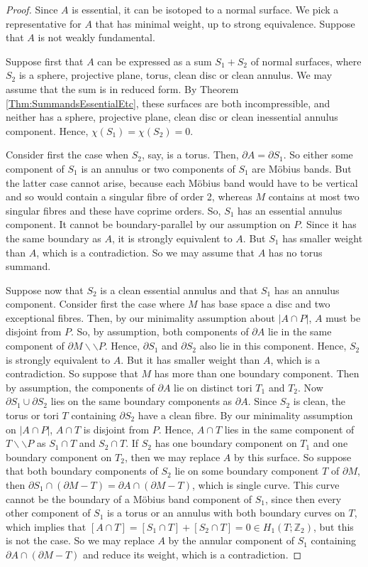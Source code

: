 \documentclass[10pt,a4paper]{amsart}
\newcommand{\cut}{\backslash\backslash}
\begin{document}
\begin{proof}
Since $A$ is essential, it can be isotoped to a normal surface. We pick a 
representative for $A$ that has minimal weight, up to strong equivalence. 
Suppose that $A$ is not weakly fundamental.

Suppose first that $A$ can be expressed as a sum
$S_1 + S_2$ of normal surfaces, where $S_2$ is a sphere, projective plane, torus, clean disc or clean annulus. We may assume
that the sum is in reduced form.
By Theorem \ref{Thm:SummandsEssentialEtc}, these surfaces are both incompressible,
and neither has a sphere, projective plane, clean disc or clean inessential annulus component. Hence, $\chi(S_1) = \chi(S_2) = 0$.

Consider first the case when $S_2$, say, is a torus. Then, $\partial A = \partial S_1$.
So either some component of $S_1$ is an annulus or two components of $S_1$ are
M\"obius bands. But the latter case cannot arise, because each M\"obius band would have to be vertical and so would contain
a singular fibre of order 2, whereas $M$ contains at most two singular fibres and these have coprime orders.
So, $S_1$ has an essential annulus component. It cannot be boundary-parallel by our assumption on $P$.
Since it has the same boundary as $A$, it
is strongly equivalent to $A$. But $S_1$ has smaller weight than $A$, which is a contradiction.
So we may assume that $A$ has no torus summand.

Suppose now that $S_2$ is a clean essential annulus and that $S_1$ has an annulus component. 
Consider first the case where $M$ has base space a disc and two exceptional fibres.
Then, by our minimality assumption about $|A \cap P|$, $A$ must be disjoint from $P$.
So, by assumption, both components of $\partial A$ lie in the
same component of $\partial M \cut P$. Hence, $\partial S_1$ and
$\partial S_2$ also lie in this component. Hence, $S_2$ is strongly
equivalent to $A$. But it has smaller weight than $A$, which is a contradiction.
So suppose that $M$ has more than one boundary component. Then by assumption, the components of $\partial A$
lie on distinct tori $T_1$ and $T_2$. Now $\partial S_1 \cup \partial S_2$
lies on the same boundary components as $\partial A$. Since $S_2$ is clean,
the torus or tori $T$ containing $\partial S_2$ have a clean fibre. By our minimality 
assumption on $|A \cap P|$, $A \cap T$ is disjoint from $P$. Hence, $A \cap T$ lies
in the same component of $T \cut P$ as $S_1 \cap T$ and $S_2 \cap T$.
If $S_2$ has one boundary component
on $T_1$ and one boundary component on $T_2$, then we may replace $A$ by this surface.
So suppose that both boundary components of $S_2$ lie on some boundary
component $T$ of $\partial M$, then $\partial S_1 \cap (\partial M - T) = \partial A \cap (\partial M - T)$,
which is single curve. This curve cannot be the boundary of a M\"obius band component of $S_1$,
since then every other component of $S_1$ is a torus or an annulus with both boundary curves on $T$,
which implies that $[A \cap T] = [S_1 \cap T] + [S_2 \cap T] =0 \in H_1(T; \mathbb{Z}_2)$,
but this is not the case.
So we may replace $A$ by the annular component of $S_1$ containing $\partial A \cap (\partial M - T)$
and reduce its weight, which is a contradiction.


\end{proof}
\end{document}
